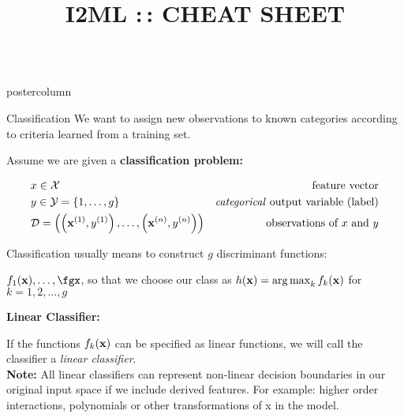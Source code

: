 \documentclass{beamer}
\title{I2ML :\,: CHEAT SHEET} %
\begin{document}
\begin{frame}[fragile]{}
\begin{columns}
	\begin{column}{.31\textwidth}
		\begin{beamercolorbox}[center]{postercolumn}
			\begin{minipage}{.98\textwidth}
				\parbox[t][\columnheight]{\textwidth}{				
					\begin{myblock}{Classification}
						We want to assign new observations to known categories according to criteria learned from a training set.  
						\vspace*{1ex}
						\begin{codebox}
						    Assume we are given a \textbf{classification problem:}
						\end{codebox}
						\begin{eqnarray*} & x \in \mathcal{X} \quad & \text{feature vector}\\ & y \in \mathcal{Y} = \{1, \ldots, g\} \quad & \text{\emph{categorical} output variable (label)}\\ &\mathcal{D} = \left( \left(\mathbf{x}^{(1)}, y^{(1)}\right), \ldots, \left(\mathbf{x}^{(n)}, y^{(n)}\right)\right) & \text{observations of $x$ and $y$} \end{eqnarray*}
						
						\vspace*{1ex}
						
						\begin{codebox}
							Classification usually means to construct $g$ discriminant functions:
						\end{codebox}
						\hspace*{1ex}$f_1(\xv), \ldots, \fgx$, so that we choose our class as $h(\mathbf{x}) = \mathop{\mathrm{arg\,max}}_k f_{k}(\mathbf{x})$ \hspace*{1ex}for $k = 1, 2,\ldots, g$
						
						\vspace*{1ex}
						
						\begin{codebox}
							\textbf{Linear Classifier:}
						\end{codebox}
						\hspace*{1ex}If the functions $f_{k}(\mathbf{x})$ can be specified as linear functions, we will call \hspace*{1ex}the classifier a \emph{linear classifier}.\\
						
						\hspace*{1ex}\textbf{Note: }All linear classifiers can represent non-linear decision boundaries \hspace*{1ex}in our original input space if we include derived features. For example: \hspace*{1ex}higher order interactions, polynomials or other transformations of x in \hspace*{1ex}the model.
			

\end{myblock}}
\end{minipage}
\end{beamercolorbox}
\end{column}
\end{columns}
\end{frame}
\end{document}
